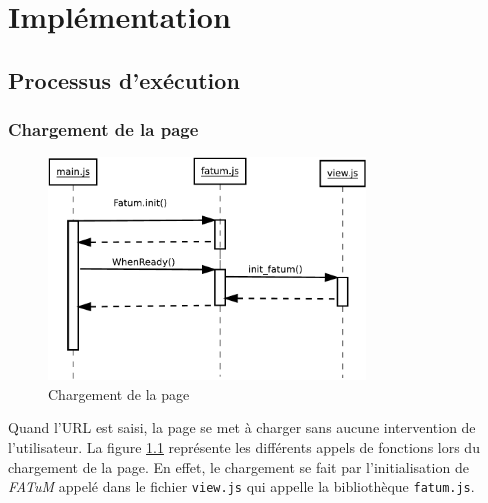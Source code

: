 \chapter{Implémentation}
\label{ch:implementation}
\section{Processus d'exécution}
\subsection{Chargement de la page}

\begin{figure}[H]
  \centering
    \includegraphics[width=0.75\textwidth]{diagram/document.pdf}
        \caption{Chargement de la page}
        \label{fig:chargement}
\end{figure}
Quand l'URL est saisi, la page se met à charger sans aucune intervention de l'utilisateur.
La figure \ref{fig:chargement} représente les différents appels de fonctions lors du chargement de la page. En effet, le chargement se fait par l'initialisation de \textit{FATuM} appelé dans le fichier {\tt view.js} qui appelle la bibliothèque {\tt fatum.js}.

